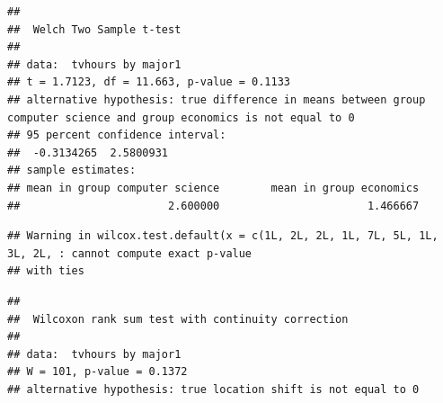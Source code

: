 \documentclass[
]{book}
\newenvironment{Shaded}{\begin{snugshade}}{\end{snugshade}}
\newcommand{\AttributeTok}[1]{\textcolor[rgb]{0.77,0.63,0.00}{#1}}
\newcommand{\CommentTok}[1]{\textcolor[rgb]{0.56,0.35,0.01}{\textit{#1}}}
\newcommand{\DecValTok}[1]{\textcolor[rgb]{0.00,0.00,0.81}{#1}}
\newcommand{\FunctionTok}[1]{\textcolor[rgb]{0.00,0.00,0.00}{#1}}
\newcommand{\NormalTok}[1]{#1}
\newcommand{\SpecialCharTok}[1]{\textcolor[rgb]{0.00,0.00,0.00}{#1}}
\newcommand{\StringTok}[1]{\textcolor[rgb]{0.31,0.60,0.02}{#1}}
\theoremstyle{definition}
\theoremstyle{definition}
\theoremstyle{definition}
\theoremstyle{definition}
\theoremstyle{remark}
\begin{document}
\begin{verbatim}
## 
##  Welch Two Sample t-test
## 
## data:  tvhours by major1
## t = 1.7123, df = 11.663, p-value = 0.1133
## alternative hypothesis: true difference in means between group computer science and group economics is not equal to 0
## 95 percent confidence interval:
##  -0.3134265  2.5800931
## sample estimates:
## mean in group computer science        mean in group economics 
##                       2.600000                       1.466667
\end{verbatim}

\begin{Shaded}
\end{Shaded}

\begin{verbatim}
## Warning in wilcox.test.default(x = c(1L, 2L, 2L, 1L, 7L, 5L, 1L, 3L, 2L, : cannot compute exact p-value
## with ties
\end{verbatim}

\begin{verbatim}
## 
##  Wilcoxon rank sum test with continuity correction
## 
## data:  tvhours by major1
## W = 101, p-value = 0.1372
## alternative hypothesis: true location shift is not equal to 0
\end{verbatim}

\begin{Shaded}
\end{Shaded}
\end{document}
